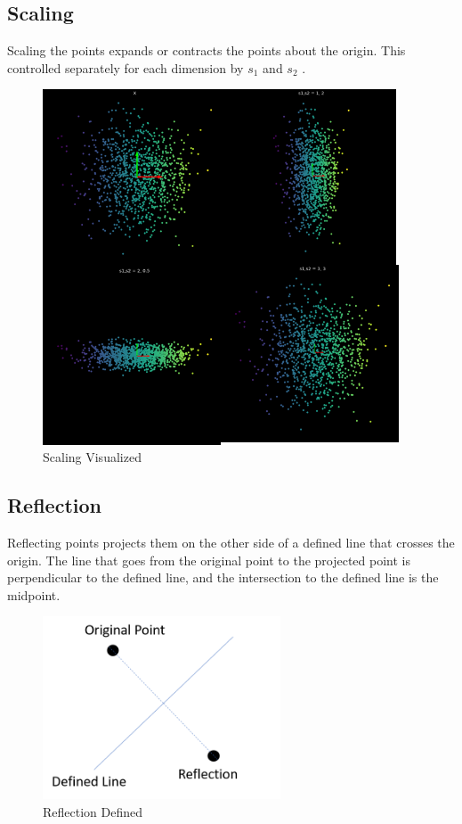 \subsection{Scaling}
Scaling the points expands or contracts the points about the origin. 
This controlled separately for each dimension by \(s_1\) and \(s_2\) .

\begin{figure}[H]
\begin{center}
\includegraphics[width=300pt]{figs/Scaling.png}
\caption{Scaling Visualized}
\end{center} 
\end{figure}


\subsection{Reflection}
Reflecting points projects them on the other side of a defined line that crosses the origin. 
The line that goes from the original point to the projected point is perpendicular to the defined line, and the intersection to the defined line is the midpoint.


\begin{figure}[H]
\begin{center}
\includegraphics[width=200pt]{figs/reflection_example.png}
\end{center} 
\caption{Reflection Defined}
\end{figure}


